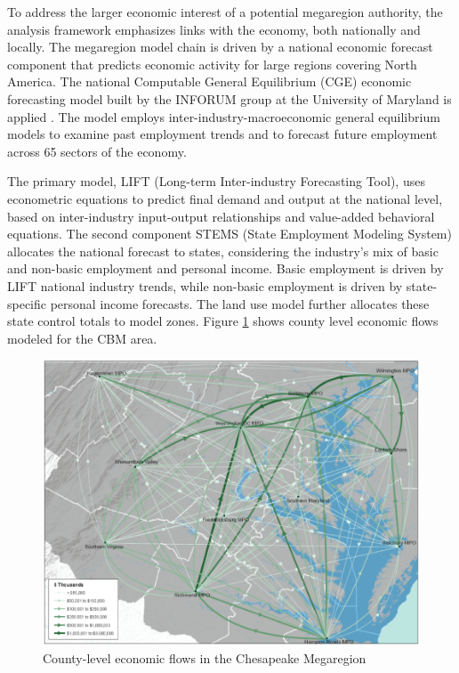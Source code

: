 To address the larger economic interest of a potential megaregion authority, the analysis framework emphasizes links with the economy, both nationally and locally. The megaregion model chain is driven by a national economic forecast component that predicts economic activity for large regions covering North America. The national Computable General Equilibrium (CGE) economic forecasting model built by the INFORUM group at the University of Maryland is applied \citep{mccarthy91}. The model employs inter-industry-macroeconomic general equilibrium models to examine past employment trends and to forecast future employment across 65 sectors of the economy. 

The primary model, LIFT (Long-term Inter-industry Forecasting Tool), uses econometric equations to predict final demand and output at the national level, based on inter-industry input-output relationships and value-added behavioral equations. The second component STEMS (State Employment Modeling System) allocates the national forecast to states, considering the industry's mix of basic and non-basic employment and personal income. Basic employment is driven by LIFT national industry trends, while non-basic employment is driven by state-specific personal income forecasts. The land use model further allocates these state control totals to model zones. Figure \ref{fig:county-level-flows} shows county level economic flows modeled for the CBM area.

\begin{figure} [!t]
\centering
\includegraphics[width=6.5in]{graphics/50-county-level-flows}
\caption{County-level economic flows in the Chesapeake Megaregion}
\label{fig:county-level-flows}
\end{figure}

